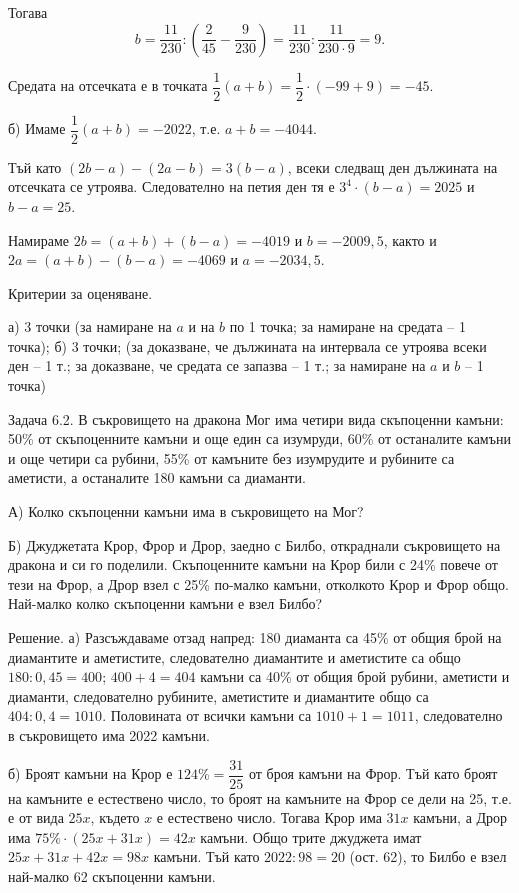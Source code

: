 Тогава
$$
b=\frac{11}{230}:\left(\frac{2}{45}-\frac{9}{230}\right)=\frac{11}{230}:\frac{11}{230\cdot9}=9.
$$

Средата на отсечката е в точката $\dfrac12(a+b)=\dfrac12\cdot(-99+9)=-45$.

б) Имаме $\dfrac12(a+b)=-2022$, т.е. $a+b=-4044$.

Тъй като $(2b-a)-(2a-b)=3(b-a)$, всеки следващ ден дължината на отсечката се утроява. Следователно на петия ден тя е $3^4\cdot(b-a)=2025$ и $b-a=25$.

Намираме $2b=(a+b)+(b-a)=-4019$ и $b=-2009,5$, както и $2a=(a+b)-(b-a)=-4069$ и $a=-2034,5$.

Критерии за оценяване.

а) 3 точки (за намиране на $a$ и на $b$ по 1 точка; за намиране на средата – 1 точка); б) 3 точки; (за доказване, че дължината на интервала се утроява всеки ден – 1 т.; за доказване, че средата се запазва – 1 т.; за намиране на $a$ и $b$ – 1 точка)

Задача 6.2. В съкровището на дракона Мог има четири вида скъпоценни камъни: 50\% от скъпоценните камъни и още един са изумруди, 60\% от останалите камъни и още четири са рубини, 55\% от камъните без изумрудите и рубините са аметисти, а останалите 180 камъни са диаманти.

А) Колко скъпоценни камъни има в съкровището на Мог?

Б) Джуджетата Крор, Фрор и Дрор, заедно с Билбо, откраднали съкровището на дракона и си го поделили. Скъпоценните камъни на Крор били с 24\% повече от тези на Фрор, а Дрор взел с 25\% по-малко камъни, отколкото Крор и Фрор общо. Най-малко колко скъпоценни камъни е взел Билбо?

Решение. а) Разсъждаваме отзад напред: 180 диаманта са 45\% от общия брой на диамантите и аметистите, следователно диамантите и аметистите са общо $180:0,45=400$; $400+4=404$ камъни са 40\% от общия брой рубини, аметисти и диаманти, следователно рубините, аметистите и диамантите общо са $404:0,4=1010$. Половината от всички камъни са $1010+1=1011$, следователно в съкровището има 2022 камъни.

б) Броят камъни на Крор е $124\%=\dfrac{31}{25}$ от броя камъни на Фрор. Тъй като броят на камъните е естествено число, то броят на камъните на Фрор се дели на 25, т.е. е от вида $25x$, където $x$ е естествено число. Тогава Крор има $31x$ камъни, а Дрор има $75\%\cdot(25x+31x)=42x$ камъни. Общо трите джуджета имат $25x+31x+42x=98x$ камъни. Тъй като $2022:98=20$ (ост. 62), то Билбо е взел най-малко 62 скъпоценни камъни.

